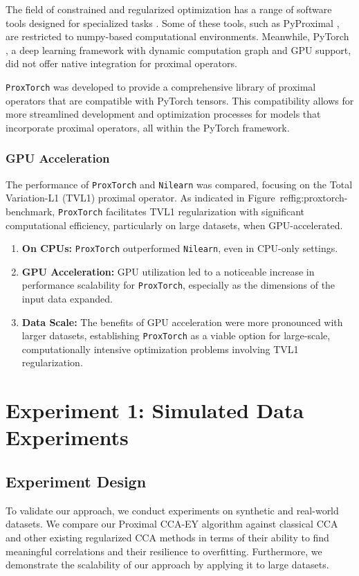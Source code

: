 The field of constrained and regularized optimization has a range of software tools designed for specialized tasks \citep{Moolekamp, ParsimonY}. Some of these tools, such as PyProximal \citep{pyproximal}, are restricted to numpy-based computational environments. Meanwhile, PyTorch \citep{paszke2019pytorch}, a deep learning framework with dynamic computation graph and GPU support, did not offer native integration for proximal operators. 

\texttt{ProxTorch} was developed to provide a comprehensive library of proximal operators that are compatible with PyTorch tensors. This compatibility allows for more streamlined development and optimization processes for models that incorporate proximal operators, all within the PyTorch framework.

\subsubsection{GPU Acceleration}

The performance of \texttt{ProxTorch} and \texttt{Nilearn} was compared, focusing on the Total Variation-L1 (TVL1) proximal operator. As indicated in Figure~ref{fig:proxtorch-benchmark}, \texttt{ProxTorch} facilitates TVL1 regularization with significant computational efficiency, particularly on large datasets, when GPU-accelerated.

\begin{enumerate}
    \item \textbf{On CPUs:} \texttt{ProxTorch} outperformed \texttt{Nilearn}, even in CPU-only settings.
    
    \item \textbf{GPU Acceleration:} GPU utilization led to a noticeable increase in performance scalability for \texttt{ProxTorch}, especially as the dimensions of the input data expanded. 
    
    \item \textbf{Data Scale:} The benefits of GPU acceleration were more pronounced with larger datasets, establishing \texttt{ProxTorch} as a viable option for large-scale, computationally intensive optimization problems involving TVL1 regularization.
\end{enumerate}


\section{Experiment 1: Simulated Data Experiments}
\subsection{Experiment Design}
To validate our approach, we conduct experiments on synthetic and real-world datasets.
We compare our Proximal CCA-EY algorithm against classical CCA and other existing regularized CCA methods in terms of their ability to find meaningful correlations and their resilience to overfitting.
Furthermore, we demonstrate the scalability of our approach by applying it to large datasets.


